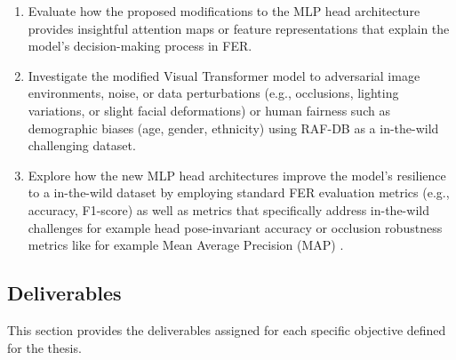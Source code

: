 \begin{enumerate}
	\item Evaluate how the proposed modifications to the MLP head architecture provides insightful attention maps or feature representations that explain the model's decision-making process in FER.
	
\item Investigate the modified Visual Transformer model to adversarial image environments, noise, or data perturbations (e.g., occlusions, lighting variations, or slight facial deformations) or human fairness such as demographic biases (age, gender, ethnicity) using RAF-DB as a in-the-wild challenging dataset. 
	
\item Explore how the new MLP head architectures improve the model’s resilience to a in-the-wild dataset by employing standard FER evaluation metrics (e.g., accuracy, F1-score) as well as metrics that specifically address in-the-wild challenges for example head pose-invariant accuracy \cite{guo_occrob_2023} or occlusion robustness metrics like for example  Mean Average Precision (MAP) \cite{marcu_pitfalls_2022} \cite{ranjan_light-weight_2018}.
	
\end{enumerate}

\subsection{Deliverables}

This section provides the deliverables assigned for each specific objective defined for the thesis.



